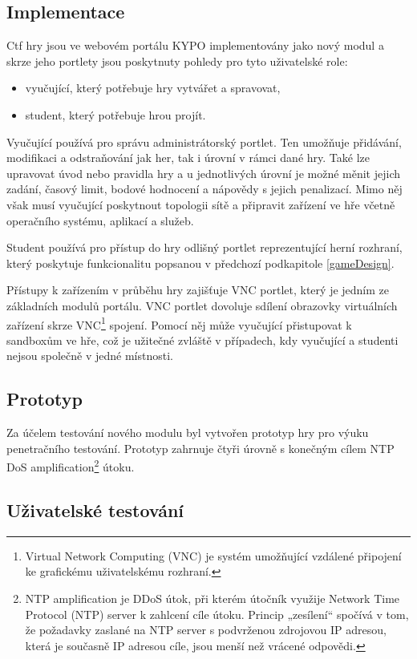 \documentclass[
  digital, %
  oneside, %
  table,   %
  nolof,     %
  nolot,     %
]{fithesis3}
\begin{document}
\subsection{Implementace}
Ctf hry jsou ve webovém portálu KYPO implementovány jako nový modul a skrze jeho portlety jsou poskytnuty pohledy pro tyto uživatelské role:
\begin{itemize}
  \item vyučující, který potřebuje hry vytvářet a spravovat,
  \item student, který potřebuje hrou projít.
\end{itemize}
Vyučující používá pro správu administrátorský portlet. Ten umožňuje přidávání, modifikaci a odstraňování jak her, tak i úrovní v rámci dané hry. Také lze upravovat úvod nebo pravidla hry a u jednotlivých úrovní je možné měnit jejich zadání, časový limit, bodové hodnocení a nápovědy s jejich penalizací. Mimo něj však musí vyučující poskytnout topologii sítě a připravit zařízení ve hře včetně operačního systému, aplikací a služeb. \cite{ctfDesign, Dankovcikova2015thesis}\par
Student používá pro přístup do hry odlišný portlet reprezentující herní rozhraní, který poskytuje funkcionalitu popsanou v předchozí podkapitole \ref{gameDesign}.\par
Přístupy k zařízením v průběhu hry zajišťuje VNC portlet, který je jedním ze základních modulů portálu. VNC portlet dovoluje sdílení obrazovky virtuálních zařízení skrze VNC\footnote{Virtual Network Computing (VNC) je systém umožňující vzdálené připojení ke grafickému uživatelskému rozhraní.} spojení. Pomocí něj může vyučující přistupovat k sandboxům ve hře, což je užitečné zvláště v případech, kdy vyučující a studenti nejsou společně v jedné místnosti.\cite{ctfDesign}
\subsection{Prototyp}
Za účelem testování nového modulu byl vytvořen prototyp hry pro výuku penetračního testování. Prototyp zahrnuje čtyři úrovně s konečným cílem NTP DoS amplification\footnote{NTP amplification je DDoS útok, při kterém útočník využije Network Time Protocol (NTP) server k zahlcení cíle útoku. Princip „zesílení“ spočívá v tom, že požadavky zaslané na NTP server s podvrženou zdrojovou IP adresou, která je současně IP adresou cíle, jsou menší než vrácené odpovědi.} útoku.
\subsection{Uživatelské testování}
\end{document}
